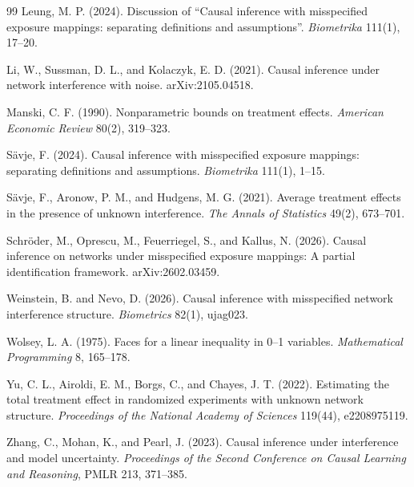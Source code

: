 \documentclass[11pt]{article}
\theoremstyle{definition}
\theoremstyle{plain}
\theoremstyle{remark}
\begin{document}
\begin{thebibliography}{99}
Leung, M. P. (2024).
Discussion of ``Causal inference with misspecified exposure mappings: separating definitions and assumptions''.
\emph{Biometrika} 111(1), 17--20.

Li, W., Sussman, D. L., and Kolaczyk, E. D. (2021).
Causal inference under network interference with noise.
arXiv:2105.04518.

Manski, C. F. (1990).
Nonparametric bounds on treatment effects.
\emph{American Economic Review} 80(2), 319--323.

Sävje, F. (2024).
Causal inference with misspecified exposure mappings: separating definitions and assumptions.
\emph{Biometrika} 111(1), 1--15.

Sävje, F., Aronow, P. M., and Hudgens, M. G. (2021).
Average treatment effects in the presence of unknown interference.
\emph{The Annals of Statistics} 49(2), 673--701.

Schröder, M., Oprescu, M., Feuerriegel, S., and Kallus, N. (2026).
Causal inference on networks under misspecified exposure mappings: A partial identification framework.
arXiv:2602.03459.

Weinstein, B. and Nevo, D. (2026).
Causal inference with misspecified network interference structure.
\emph{Biometrics} 82(1), ujag023.

Wolsey, L. A. (1975).
Faces for a linear inequality in 0--1 variables.
\emph{Mathematical Programming} 8, 165--178.

Yu, C. L., Airoldi, E. M., Borgs, C., and Chayes, J. T. (2022).
Estimating the total treatment effect in randomized experiments with unknown network structure.
\emph{Proceedings of the National Academy of Sciences} 119(44), e2208975119.

Zhang, C., Mohan, K., and Pearl, J. (2023).
Causal inference under interference and model uncertainty.
\emph{Proceedings of the Second Conference on Causal Learning and Reasoning}, PMLR 213, 371--385.
\end{thebibliography}
\end{document}
